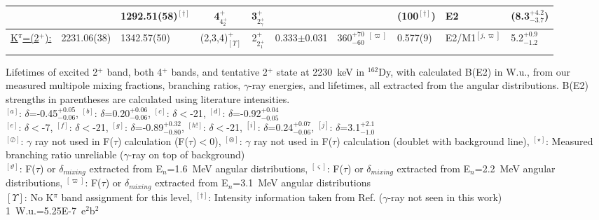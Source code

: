 \begin{landscape}
\begin{center}
\begin{longtable}{cllcccllll}
                                  &             &  1292.51(58)$^{[\dagger]}$ & 4$^+_{4^+_2}$ & 3$^+_{2^+_\gamma}$ &&                                                              &(100$^{[\dagger]}$)                & E2                                 & (8.3$^{+4.2}_{-3.7}$)        \\ \hline
\underline{K$^\pi$=(2$^+$):}      & 2231.06(38) & 1342.57(50)               & (2,3,4)$^+_{[\Upsilon]}$& 2$^+_{2^+_1}$ &0.333$\pm$0.031& 360$^{+70}_{-60}$ $^{[\varpi]}$       &0.577(9)             & E2/M1$^{[j,\varpi]}$  & 5.2$^{+0.9}_{-1.2}$\\ \hline
\vspace{10pt}
\end{longtable}
\end{center}
Lifetimes of excited 2$^+$ band, both 4$^+$ bands, and tentative 2$^+$ state at 2230~keV in $^{162}$Dy, with calculated B(E2) in W.u., from our measured multipole mixing fractions, branching ratios, $\gamma$-ray energies, and lifetimes, all extracted from the angular distributions. B(E2) strengths in parentheses are calculated using literature intensities.\\
{\small $^{[a]}$: $\delta$=-0.45$^{+0.05}_{-0.06}$},
{\small $^{[b]}$: $\delta$=0.20$^{+0.06}_{-0.06}$},
{\small $^{[c]}$: $\delta<$-21},
{\small $^{[d]}$: $\delta$=-0.92$^{+0.04}_{-0.05}$}\\
{\small $^{[e]}$: $\delta<$-7},
{\small $^{[f]}$: $\delta<$-21},
{\small $^{[g]}$: $\delta$=-0.89$^{+0.32}_{-0.80}$},
{\small $^{[h!]}$: $\delta<$-21},
{\small $^{[i]}$: $\delta$=0.24$^{+0.07}_{-0.06}$},
{\small $^{[j]}$: $\delta$=3.1$^{+2.1}_{-1.0}$}\\
{\small $^{[\oslash]}$: $\gamma$ ray not used in F($\tau$) calculation (F($\tau$)$<$0),}
{\small $^{[\otimes]}$: $\gamma$ ray not used in F($\tau$) calculation (doublet with background line),}
{\small $^{[\star]}$: Measured branching ratio unreliable ($\gamma$-ray on top of background)}\\
{\small $^{[\vartheta]}$: F($\tau$) or $\delta_{mixing}$ extracted from E$_n$=1.6~MeV angular distributions},
{\small $^{[\varsigma]}$: F($\tau$) or $\delta_{mixing}$ extracted from E$_n$=2.2~MeV angular distributions},
{\small $^{[\varpi]}$: F($\tau$) or $\delta_{mixing}$ extracted from E$_n$=3.1~MeV angular distributions}\\
{\small $[\Upsilon]$: No K$^\pi$ band assignment for this level},
{\small $^{[\dagger]}$: Intensity information taken from Ref. \cite{Wu_2minus_2001} ($\gamma$-ray not seen in this work)}\\
{\small 1~W.u.=5.25E-7~e$^2$b$^2$}


\end{landscape}


